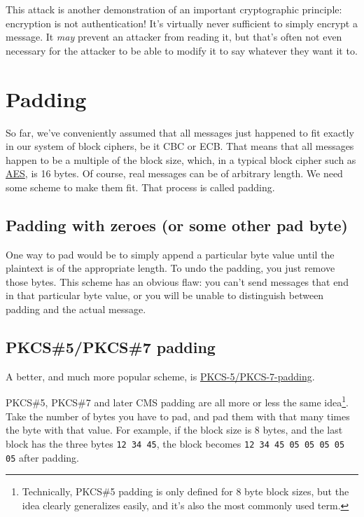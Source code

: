 \documentclass[11pt,ebook,table,dvipsnames]{memoir}
\begin{document}
This attack is another demonstration of an important cryptographic
principle: encryption is not authentication! It's virtually never
sufficient to simply encrypt a message. It \emph{may} prevent an attacker
from reading it, but that's often not even necessary for the attacker
to be able to modify it to say whatever they want it to.
\section{Padding}
\label{sec-2-3-6}

So far, we've conveniently assumed that all messages just happened to
fit exactly in our system of block ciphers, be it CBC or ECB. That
means that all messages happen to be a multiple of the block size,
which, in a typical block cipher such as \hyperref[AES]{AES}, is 16 bytes. Of course,
real messages can be of arbitrary length. We need some scheme to make
them fit. That process is called padding.

\subsection{Padding with zeroes (or some other pad byte)}
\label{sec-2-3-6-1}

One way to pad would be to simply append a particular byte value until
the plaintext is of the appropriate length. To undo the padding, you
just remove those bytes. This scheme has an obvious flaw: you can't
send messages that end in that particular byte value, or you will be
unable to distinguish between padding and the actual message.
\subsection{\label{PKCS-5/PKCS-7-padding}PKCS\#5/PKCS\#7 padding}
\label{sec-2-3-6-2}

A better, and much more popular scheme, is \hyperref[PKCS\#5/PKCS\#7 padding]{PKCS-5/PKCS-7-padding}.

PKCS\#5, PKCS\#7 and later CMS padding are all more or less the same
idea\footnote{Technically, PKCS\#5 padding is only defined for 8 byte block
sizes, but the idea clearly generalizes easily, and it's also the most
commonly used term.}. Take the number of bytes you have to pad, and
pad them with that many times the byte with that value. For example,
if the block size is 8 bytes, and the last block has the three bytes
\texttt{12 34 45}, the block becomes \texttt{12 34 45 05 05 05 05 05} after padding.
\end{document}
